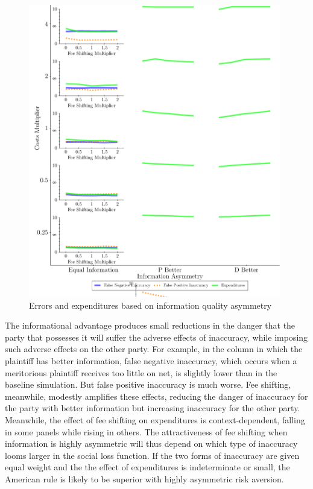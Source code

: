 \documentclass{article}
\begin{document}
\begin{figure}
\begin{minipage}{0.48\textwidth}
        \includegraphics[width=0.98\textwidth, scale=0.70, trim={0in 0in 0in 0in}, clip]{../Figures/Accuracy and Expenditures Varying Information Asymmetry} %
        \caption{Errors and expenditures based on information quality asymmetry}
		\label{fig:accexp_playernoise_asymmetry}
    \end{minipage}
\end{figure}

The informational advantage produces small reductions in the danger that the party that possesses it will suffer the adverse effects of inaccuracy, while imposing such adverse effects on the other party. For example, in the column in which the plaintiff has better information, false negative inaccuracy, which occurs when a meritorious plaintiff receives too little on net, is slightly lower than in the baseline simulation.  But false positive inaccuracy is much worse. Fee shifting, meanwhile, modestly amplifies these effects, reducing the danger of inaccuracy for the party with better information but increasing inaccuracy for the other party. Meanwhile, the effect of fee shifting on expenditures is context-dependent, falling in some panels while rising in others. The attractiveness of fee shifting when information is highly asymmetric will thus depend on which type of inaccuracy looms larger in the social loss function. If the two forms of inaccuracy are given equal weight and the the effect of expenditures is indeterminate or small, the American rule is likely to be superior with highly asymmetric risk aversion.
\end{document}
